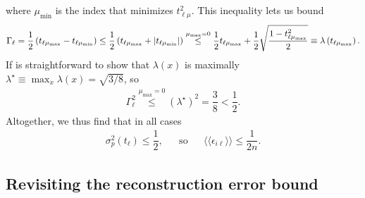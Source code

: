 \documentclass[notitlepage,twocolumn]{revtex4-2}
\renewcommand{\t}{\text} %
\newcommand{\f}[2]{\dfrac{#1}{#2}} %
\newcommand{\p}[1]{\left(#1\right)} %
\newcommand{\bbk}[1]{\langle\!\langle #1 \rangle\!\rangle}
\begin{document}
where $\mu_{\t{min}}$ is the index that minimizes $t_{\ell\mu}^2$.
This inequality lets us bound
\begin{align}
  \Gamma_\ell
  = \f12 \p{t_{\ell\mu_{\t{max}}} - t_{\ell\mu_{\t{min}}}}
  \le \f12 \p{t_{\ell\mu_{\t{max}}} + \abs{t_{\ell\mu_{\t{min}}}}}
  \stackrel{\mu_{\t{max}}=0}{\le}
  \f12 t_{\ell\mu_{\t{max}}}
  + \f12\sqrt{\f{1 - t_{\ell\mu_{\t{max}}}^2}{2}}
  \equiv \lambda\p{t_{\ell\mu_{\t{max}}}}.
\end{align}
If is straightforward to show that $\lambda\p{x}$ is maximally $\lambda^\star\equiv \max_x \lambda\p{x} = \sqrt{3/8}$, so
\begin{align}
  \Gamma_\ell^2
  \stackrel{\mu_{\t{max}}=0}{\le} \p{\lambda^\star}^2
  = \f38 < \f12.
\end{align}
Altogether, we thus find that in all cases
\begin{align}
  \sigma_p^2\p{t_\ell} \le \f12,
  &&
  \t{so}
  &&
  \bbk{\epsilon_{i\ell}} \le \f1{2n}.
\end{align}

\subsection{Revisiting the reconstruction error bound}
\label{sec:revisiting}
\end{document}
